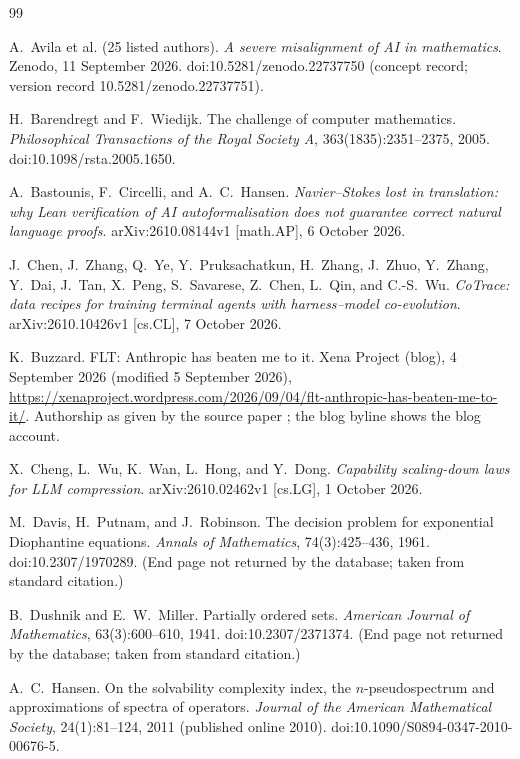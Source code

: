 \begin{thebibliography}{99}

 A.~Avila et al. (25 listed authors). \emph{A severe misalignment of AI in mathematics}. Zenodo, 11 September 2026. doi:10.5281/zenodo.22737750 (concept record; version record 10.5281/zenodo.22737751).

 H.~Barendregt and F.~Wiedijk. The challenge of computer mathematics. \emph{Philosophical Transactions of the Royal Society A}, 363(1835):2351--2375, 2005. doi:10.1098/rsta.2005.1650.

 A.~Bastounis, F.~Circelli, and A.~C.~Hansen. \emph{Navier--Stokes lost in translation: why Lean verification of AI autoformalisation does not guarantee correct natural language proofs}. arXiv:2610.08144v1 [math.AP], 6 October 2026.

 J.~Chen, J.~Zhang, Q.~Ye, Y.~Pruksachatkun, H.~Zhang, J.~Zhuo, Y.~Zhang, Y.~Dai, J.~Tan, X.~Peng, S.~Savarese, Z.~Chen, L.~Qin, and C.-S.~Wu. \emph{CoTrace: data recipes for training terminal agents with harness--model co-evolution}. arXiv:2610.10426v1 [cs.CL], 7 October 2026.

 K.~Buzzard. FLT: Anthropic has beaten me to it. Xena Project (blog), 4 September 2026 (modified 5 September 2026), \url{https://xenaproject.wordpress.com/2026/09/04/flt-anthropic-has-beaten-me-to-it/}. Authorship as given by the source paper \cite{BCH26}; the blog byline shows the blog account.

 X.~Cheng, L.~Wu, K.~Wan, L.~Hong, and Y.~Dong. \emph{Capability scaling-down laws for LLM compression}. arXiv:2610.02462v1 [cs.LG], 1 October 2026.

 M.~Davis, H.~Putnam, and J.~Robinson. The decision problem for exponential Diophantine equations. \emph{Annals of Mathematics}, 74(3):425--436, 1961. doi:10.2307/1970289. (End page not returned by the database; taken from standard citation.)

 B.~Dushnik and E.~W.~Miller. Partially ordered sets. \emph{American Journal of Mathematics}, 63(3):600--610, 1941. doi:10.2307/2371374. (End page not returned by the database; taken from standard citation.)

 A.~C.~Hansen. On the solvability complexity index, the $n$-pseudospectrum and approximations of spectra of operators. \emph{Journal of the American Mathematical Society}, 24(1):81--124, 2011 (published online 2010). doi:10.1090/S0894-0347-2010-00676-5.


\end{thebibliography}

